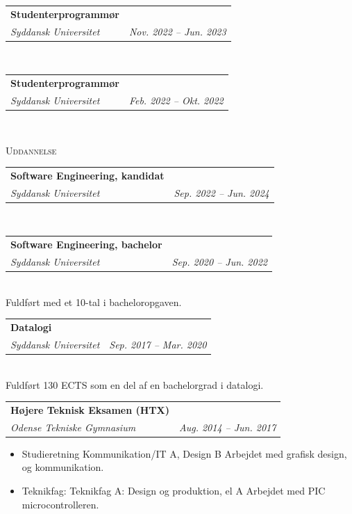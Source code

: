 \documentclass[11pt]{article}
\makeatletter
\newcommand{\resumeSubheading}[4]{
  \noindent\begin{tabular*}{0.98\textwidth}[t]{l@{\extracolsep{\fill}}r}
    \noindent \textbf{#3} & \textit{\small #2} \\ \vspace{-3pt} 
    \noindent \textit{\small #1} & \textit{\small #4} 
  \end{tabular*}\vspace{7pt}
}
\makeatother
\begin{document}
\vspace{0.3cm}
\resumeSubheading{Syddansk Universitet}{}{Studenterprogrammør}{Nov. 2022 -- Jun. 2023}\\

\vspace{0.3cm}
\resumeSubheading{Syddansk Universitet}{}{Studenterprogrammør}{Feb. 2022 -- Okt. 2022}\\




\vspace{0.3cm}
\noindent\large{\scshape{Uddannelse}} \newline
\noindent{\rule[0.3cm]{\textwidth}{0.4pt}}

\resumeSubheading{Syddansk Universitet}{}{Software Engineering, kandidat}{Sep.
2022 -- Jun. 2024}\\\vspace{0.25cm}
  \vspace{-0.3cm}
  {\indent\small } 

\vspace{0.3cm}

\resumeSubheading{Syddansk Universitet}{}{Software Engineering, bachelor}{Sep.
2020 -- Jun. 2022}\\\vspace{0.25cm}
{\indent\small Fuldført med et 10-tal i bacheloropgaven.}

\resumeSubheading{Syddansk Universitet}{}{Datalogi}{Sep. 2017
-- Mar. 2020}\\\vspace{0.25cm} 
{\indent\small Fuldført 130 ECTS som en del af en bachelorgrad i datalogi.}
  
\vspace{0.3cm}

\resumeSubheading{Odense Tekniske Gymnasium}{}{Højere Teknisk Eksamen (HTX)}{Aug. 2014 -- Jun. 2017}
{\small \begin{itemize}\vspace{-0.25cm}
  \setlength{\itemsep}{-1pt}
  \item Studieretning Kommunikation/IT A, Design B
    \subitem Arbejdet med grafisk design, og kommunikation.
  \item Teknikfag: Teknikfag A: Design og produktion, el A
    \subitem\footnotesize Arbejdet med PIC microcontrolleren.
\end{itemize}
} \vspace{0.5cm}
\end{document}
